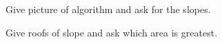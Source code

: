 \documentclass{ximera}
\begin{document}
\begin{exercise}
  Give picture of algorithm and ask for the slopes.
\end{exercise}

\begin{exercise}
  Give roofs of slope and ask which area is greatest. 
\end{exercise}
\end{document}
